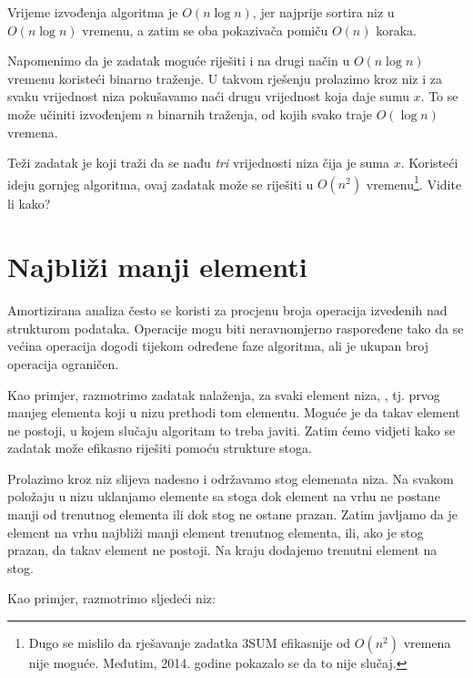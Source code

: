 Vrijeme izvođenja algoritma je
$O(n \log n)$, jer najprije sortira
niz u $O(n \log n)$ vremenu,
a zatim se oba pokazivača pomiču $O(n)$ koraka.

Napomenimo da je zadatak moguće riješiti
i na drugi način u $O(n \log n)$ vremenu koristeći binarno traženje.
U takvom rješenju prolazimo kroz niz
i za svaku vrijednost niza pokušavamo naći drugu
vrijednost koja daje sumu $x$.
To se može učiniti izvođenjem $n$ binarnih traženja,
od kojih svako traje $O(\log n)$ vremena.

Teži zadatak je 
 koji traži
da se nađu \emph{tri} vrijednosti niza
čija je suma $x$.
Koristeći ideju gornjeg algoritma,
ovaj zadatak može se riješiti u $O(n^2)$ vremenu\footnote{Dugo se
mislilo da rješavanje
zadatka 3SUM efikasnije od $O(n^2)$ vremena
nije moguće.
Međutim, 2014. godine pokazalo se \cite{gro14}
da to nije slučaj.}.
Vidite li kako?

\section{Najbliži manji elementi}


Amortizirana analiza često se koristi za
procjenu broja operacija
izvedenih nad strukturom podataka.
Operacije mogu biti neravnomjerno raspoređene tako
da se većina operacija dogodi tijekom
određene faze algoritma, ali je ukupan
broj operacija ograničen.

Kao primjer, razmotrimo zadatak
nalaženja, za svaki element niza,
, tj.
prvog manjeg elementa koji u nizu
prethodi tom elementu.
Moguće je da takav element ne postoji,
u kojem slučaju algoritam to treba javiti.
Zatim ćemo vidjeti kako se zadatak može
efikasno riješiti pomoću strukture stoga.

Prolazimo kroz niz slijeva nadesno
i održavamo stog elemenata niza.
Na svakom položaju u nizu uklanjamo elemente sa stoga
dok element na vrhu ne postane manji od
trenutnog elementa ili dok stog ne ostane prazan.
Zatim javljamo da je element na vrhu
najbliži manji element trenutnog elementa,
ili, ako je stog prazan, da takav element ne postoji.
Na kraju dodajemo trenutni element na stog.

Kao primjer, razmotrimo sljedeći niz:
\begin{center}
\end{center}

